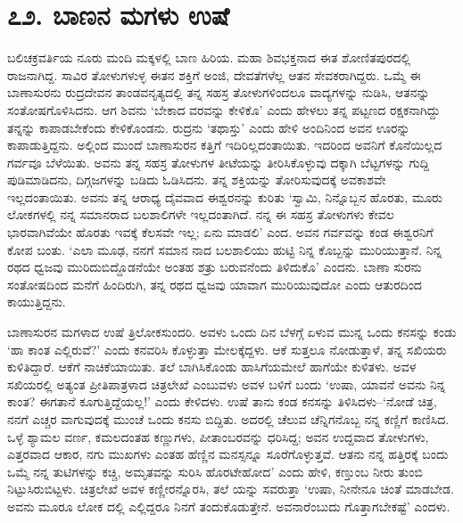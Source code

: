 
\chapter{೭೨. ಬಾಣನ ಮಗಳು ಉಷೆ}

ಬಲಿಚಕ್ರವರ್ತಿಯ ನೂರು ಮಂದಿ ಮಕ್ಕಳಲ್ಲಿ ಬಾಣ ಹಿರಿಯ. ಮಹಾ ಶಿವಭಕ್ತನಾದ ಈತ ಶೋಣಿತಪುರದಲ್ಲಿ ರಾಜನಾಗಿದ್ದ. ಸಾವಿರ ತೋಳುಗಳುಳ್ಳ ಈತನ ಶಕ್ತಿಗೆ ಅಂಜಿ, ದೇವತೆಗಳೆಲ್ಲ ಆತನ ಸೇವಕರಾಗಿದ್ದರು. ಒಮ್ಮೆ ಈ ಬಾಣಾಸುರನು ರುದ್ರದೇವನ ತಾಂಡವನೃತ್ಯದಲ್ಲಿ ತನ್ನ ಸಹಸ್ರ ತೋಳುಗಳಿಂದಲೂ ವಾದ್ಯಗಳನ್ನು ನುಡಿಸಿ, ಆತನನ್ನು ಸಂತೋಷಗೊಳಿಸಿದನು. ಆಗ ಶಿವನು ‘ಬೇಕಾದ ವರವನ್ನು ಕೇಳಿಕೊ’ ಎಂದು ಹೇಳಲು ತನ್ನ ಪಟ್ಟಣದ ರಕ್ಷಕನಾಗಿದ್ದು ತನ್ನನ್ನು ಕಾಪಾಡಬೇಕೆಂದು ಕೇಳಿಕೊಂಡನು. ರುದ್ರನು ‘ತಥಾಸ್ತು’ ಎಂದು ಹೇಳಿ ಅಂದಿನಿಂದ ಅವನ ಊರನ್ನು ಕಾಪಾಡುತ್ತಿದ್ದನು. ಅಲ್ಲಿಂದ ಮುಂದೆ ಬಾಣಾಸುರನ ಕತ್ತಿಗೆ ಇದಿರಿಲ್ಲದಂತಾಯಿತು. ಇದರಿಂದ ಅವನಿಗೆ ಕೊನೆಯಿಲ್ಲದ ಗರ್ವವೂ ಬೆಳೆಯಿತು. ಅವನು ತನ್ನ ಸಹಸ್ರ ತೋಳುಗಳ ತೀಟೆಯನ್ನು ತೀರಿಸಿಕೊಳ್ಳುವು ದಕ್ಕಾಗಿ ಬೆಟ್ಟಗಳನ್ನು ಗುದ್ದಿ ಪುಡಿಮಾಡಿದನು, ದಿಗ್ಗಜಗಳನ್ನು ಬಡಿದು ಓಡಿಸಿದನು. ತನ್ನ ಶಕ್ತಿಯನ್ನು ತೋರಿಸುವುದಕ್ಕೆ ಅವಕಾಶವೇ ಇಲ್ಲದಂತಾಯಿತು. ಅವನು ತನ್ನ ಆರಾಧ್ಯ ದೈವವಾದ ಈಶ್ವರನನ್ನು ಕುರಿತು ‘ಸ್ವಾಮಿ, ನಿನ್ನೊಬ್ಬನ ಹೊರತು, ಮೂರು ಲೋಕಗಳಲ್ಲಿ ನನ್ನ ಸಮಾನರಾದ ಬಲಶಾಲಿಗಳೇ ಇಲ್ಲದಂತಾಗಿದೆ. ನನ್ನ ಈ ಸಹಸ್ರ ತೋಳುಗಳು ಕೇವಲ ಭಾರವಾಗಿವೆಯೇ ಹೊರತು ಇವಕ್ಕೆ ಕೆಲಸವೇ ಇಲ್ಲ; ಏನು ಮಾಡಲಿ’ ಎಂದ. ಅವನ ಗರ್ವವನ್ನು ಕಂಡ ಈಶ್ವರನಿಗೆ ಕೋಪ ಬಂತು. ‘ಎಲಾ ಮೂಢ, ನನಗೆ ಸಮಾನ ನಾದ ಬಲಶಾಲಿಯು ಹುಟ್ಟಿ ನಿನ್ನ ಕೊಬ್ಬನ್ನು ಮುರಿಯುತ್ತಾನೆ. ನಿನ್ನ ರಥದ ಧ್ವಜವು ಮುರಿದುಬಿದ್ದೊಡನೆಯೇ ಅಂತಹ ಶತ್ರು ಬರುವನೆಂದು ತಿಳಿದುಕೊ’ ಎಂದನು. ಬಾಣಾ ಸುರನು ಸಂತೋಷದಿಂದ ಮನೆಗೆ ಹಿಂದಿರುಗಿ, ತನ್ನ ರಥದ ಧ್ವಜವು ಯಾವಾಗ ಮುರಿಯುವುದೋ ಎಂದು ಆತುರದಿಂದ ಕಾಯುತ್ತಿದ್ದನು.

ಬಾಣಾಸುರನ ಮಗಳಾದ ಉಷೆ ತ್ರಿಲೋಕಸುಂದರಿ. ಅವಳು ಒಂದು ದಿನ ಬೆಳಗ್ಗೆ ಏಳುವ ಮುನ್ನ ಒಂದು ಕನಸನ್ನು ಕಂಡು ‘ಹಾ ಕಾಂತ ಎಲ್ಲಿರುವೆ?’ ಎಂದು ಕನವರಿಸಿ ಕೊಳ್ಳುತ್ತಾ ಮೇಲಕ್ಕೆದ್ದಳು. ಆಕೆ ಸುತ್ತಲೂ ನೋಡುತ್ತಾಳೆ, ತನ್ನ ಸಖಿಯರು ಕುಳಿತಿದ್ದಾರೆ. ಆಕೆಗೆ ನಾಚಿಕೆಯಾಯಿತು. ತಲೆ ಬಾಗಿಸಿಕೊಂಡು ಹಾಸಿಗೆಯಮೇಲೆ ಹಾಗೆಯೇ ಕುಳಿತಳು. ಅವಳ ಸಖಿಯರಲ್ಲಿ ಅತ್ಯಂತ ಪ್ರೀತಿಪಾತ್ರಳಾದ ಚಿತ್ರಲೇಖೆ ಎಂಬುವಳು ಅವಳ ಬಳಿಗೆ ಬಂದು ‘ಉಷಾ, ಯಾವನೆ ಅವನು ನಿನ್ನ ಕಾಂತ? ಈಗತಾನೆ ಕೂಗುತ್ತಿದ್ದೆಯಲ್ಲ!’ ಎಂದು ಕೇಳಿದಳು. ಉಷೆ ತಾನು ಕಂಡ ಕನಸನ್ನು ತಿಳಿಸಿದಳು–‘ನೋಡೆ ಚಿತ್ರ, ನನಗೆ ಎಚ್ಚರ ವಾಗುವುದಕ್ಕೆ ಮುಂಚೆ ಒಂದು ಕನಸು ಬಿದ್ದಿತು. ಅದರಲ್ಲಿ ಚೆಲುವ ಚೆನ್ನಿಗನೊಬ್ಬ ನನ್ನ ಕಣ್ಣಿಗೆ ಕಾಣಿಸಿದ. ಒಳ್ಳೆ ಶ್ಯಾಮಲ ವರ್ಣ, ಕಮಲದಂತಹ ಕಣ್ಣುಗಳು, ಪೀತಾಂಬರವನ್ನು ಧರಿಸಿದ್ದ; ಅವನ ಉದ್ದವಾದ ತೋಳುಗಳು, ಎತ್ತರವಾದ ಆಕಾರ, ನಗು ಮುಖಗಳು ಎಂತಹ ಹೆಣ್ಣಿನ ಮನಸ್ಸನ್ನೂ ಸೂರೆಗೊಳ್ಳುತ್ತವೆ. ಆತನು ನನ್ನ ಹತ್ತಿರಕ್ಕೆ ಬಂದು ಒಮ್ಮೆ ನನ್ನ ತುಟಿಗಳನ್ನು ಕಚ್ಚಿ, ಅಮೃತವನ್ನು ಸುರಿಸಿ ಹೊರಟೇಹೋದ’ ಎಂದು ಹೇಳಿ, ಕಣ್ತುಂಬ ನೀರು ತುಂಬಿ ನಿಟ್ಟುಸಿರುಬಿಟ್ಟಳು. ಚಿತ್ರಲೇಖೆ ಅವಳ ಕಣ್ಣೀರನ್ನೊರಸಿ, ತಲೆ ಯನ್ನು ಸವರುತ್ತಾ ‘ಉಷಾ, ನೀನೇನೂ ಚಿಂತೆ ಮಾಡಬೇಡ. ಅವನು ಮೂರೂ ಲೋಕ ದಲ್ಲಿ ಎಲ್ಲಿದ್ದರೂ ನಿನಗೆ ತಂದುಕೊಡುತ್ತೇನೆ. ಅವನಾರೆಂಬುದು ಗೊತ್ತಾಗಬೇಕಷ್ಟೆ’ ಎಂದಳು.

